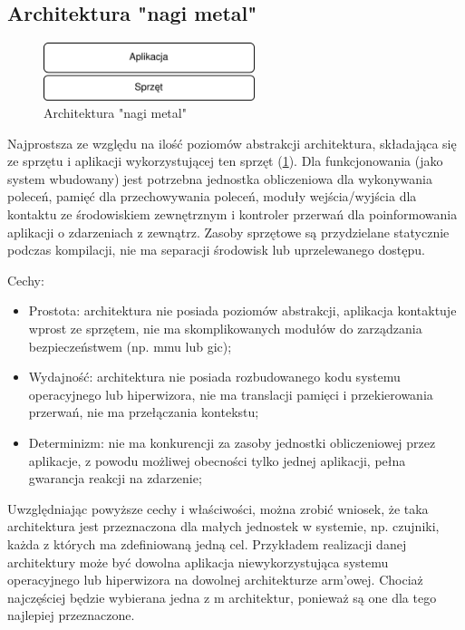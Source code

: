 \documentclass[../../main]{subfiles}
\begin{document}
\subsection{Architektura "nagi metal"}
\begin{figure}[h]
    \centering
    \includegraphics[width=0.55\textwidth]{Images/bare-metal.png}
    \caption{Architektura "nagi metal"}
    \label{fig:bare-metal}
\end{figure}

Najprostsza ze względu na ilość poziomów abstrakcji architektura, składająca się ze sprzętu i aplikacji
wykorzystującej ten sprzęt (\cref{fig:bare-metal}). Dla funkcjonowania (jako system wbudowany) jest
potrzebna jednostka obliczeniowa dla wykonywania poleceń, pamięć dla przechowywania poleceń, moduły
wejścia/wyjścia dla kontaktu ze środowiskiem zewnętrznym i kontroler przerwań dla poinformowania
aplikacji o zdarzeniach z zewnątrz. Zasoby sprzętowe są przydzielane statycznie podczas kompilacji,
nie ma separacji środowisk lub uprzelewanego dostępu. %

Cechy:
\begin{itemize}
    \item Prostota: architektura nie posiada poziomów abstrakcji, aplikacja kontaktuje wprost ze
    sprzętem, nie ma skomplikowanych modułów do zarządzania bezpieczeństwem (np. \acrshort{mmu} lub
    \acrshort{gic});
    \item Wydajność: architektura nie posiada rozbudowanego kodu systemu operacyjnego lub
    hiperwizora, nie ma translacji pamięci i przekierowania przerwań, nie ma przełączania kontekstu;
    \item Determinizm: nie ma konkurencji za zasoby jednostki obliczeniowej przez aplikacje, z powodu
    możliwej obecności tylko jednej aplikacji, pełna gwarancja reakcji na zdarzenie;
\end{itemize}

Uwzględniając powyższe cechy i właściwości, można zrobić wniosek, że taka architektura jest
przeznaczona dla małych jednostek w systemie, np. czujniki, każda z których ma zdefiniowaną jedną cel.
Przykładem realizacji danej architektury może być dowolna aplikacja niewykorzystująca systemu
operacyjnego lub hiperwizora na dowolnej architekturze \acrshort{arm}'owej. Chociaż najczęściej będzie
wybierana jedna z \acrshort{m} architektur, ponieważ są one dla tego najlepiej przeznaczone.
\end{document}

